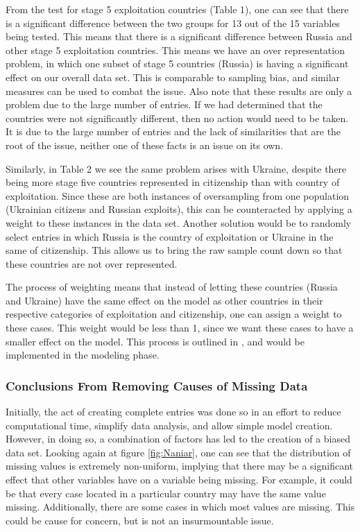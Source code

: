 \documentclass{article} %
\begin{document}
\FloatBarrier
From the test for stage 5 exploitation countries (Table 1), one can see that there is a significant difference between the two groups for 13 out of the 15 variables being tested. This means that there is a significant difference between Russia and other stage 5 exploitation countries. This means we have an over representation problem, in which one subset of stage 5 countries (Russia) is having a significant effect on our overall data set. This is comparable to sampling bias, and similar measures can be used to combat the issue. Also note that these results are only a problem due to the large number of entries. If we had determined that the countries were not significantly different, then no action would need to be taken. It is due to the large number of entries and the lack of similarities that are the root of the issue, neither one of these facts is an issue on its own.

Similarly, in Table 2 we see the same problem arises with Ukraine, despite there being more stage five countries represented in citizenship than with country of exploitation. Since these are both instances of oversampling from one population (Ukrainian citizens and Russian exploits), this can be counteracted by applying a weight to these instances in the data set. Another solution would be to randomly select entries in which Russia is the country of exploitation or Ukraine in the same of citizenship. This allows us to bring the raw sample count down so that these countries are not over represented.

The process of weighting means that instead of letting these countries (Russia and Ukraine) have the same effect on the model as other countries in their respective categories of exploitation and citizenship, one can assign a weight to these cases. This weight would be less than 1, since we want these cases to have a smaller effect on the model. This process is outlined in \cite{Oversample}, and would be implemented in the modeling phase.



\subsubsection{Conclusions From Removing Causes of Missing Data}

Initially, the act of creating complete entries was done so in an effort to reduce computational time, simplify data analysis, and allow simple model creation. However, in doing so, a combination of factors has led to the creation of a biased data set. Looking again at figure \ref{fig:Naniar}, one can see that the distribution of missing values is extremely non-uniform, implying that there may be a significant effect that other variables have on a variable being missing. For example, it could be that every case located in a particular country may have the same value missing. Additionally, there are some cases in which most values are missing. This could be cause for concern, but is not an insurmountable issue.
\end{document}
